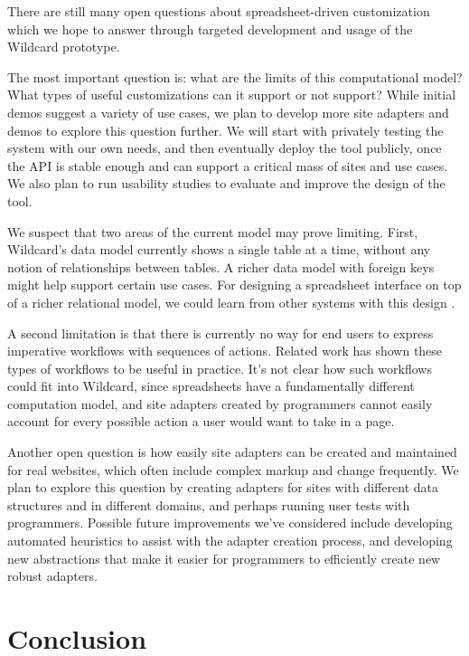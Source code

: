 \documentclass[english,submission]{programming}
\begin{document}
There are still many open questions about spreadsheet-driven
customization which we hope to answer through targeted development and
usage of the Wildcard prototype.

The most important question is: what are the limits of this
computational model? What types of useful customizations can it support
or not support? While initial demos suggest a variety of use cases, we
plan to develop more site adapters and demos to explore this question
further. We will start with privately testing the system with our own
needs, and then eventually deploy the tool publicly, once the API is
stable enough and can support a critical mass of sites and use cases. We
also plan to run usability studies to evaluate and improve the design of
the tool.

We suspect that two areas of the current model may prove limiting.
First, Wildcard's data model currently shows a single table at a time,
without any notion of relationships between tables. A richer data model
with foreign keys might help support certain use cases. For designing a
spreadsheet interface on top of a richer relational model, we could
learn from other systems with this design
\autocite{mccutchen2016,bakke2016}.

A second limitation is that there is currently no way for end users to
express imperative workflows with sequences of actions. Related work has
shown these types of workflows to be useful
\autocite{bolin2005,leshed2008} in practice. It's not clear how such
workflows could fit into Wildcard, since spreadsheets have a
fundamentally different computation model, and site adapters created by
programmers cannot easily account for every possible action a user would
want to take in a page.

Another open question is how easily site adapters can be created and
maintained for real websites, which often include complex markup and
change frequently. We plan to explore this question by creating adapters
for sites with different data structures and in different domains, and
perhaps running user tests with programmers. Possible future
improvements we've considered include developing automated heuristics to
assist with the adapter creation process, and developing new
abstractions that make it easier for programmers to efficiently create
new robust adapters.

\hypertarget{conclusion}{%
\section{Conclusion}\label{conclusion}}
\end{document}
